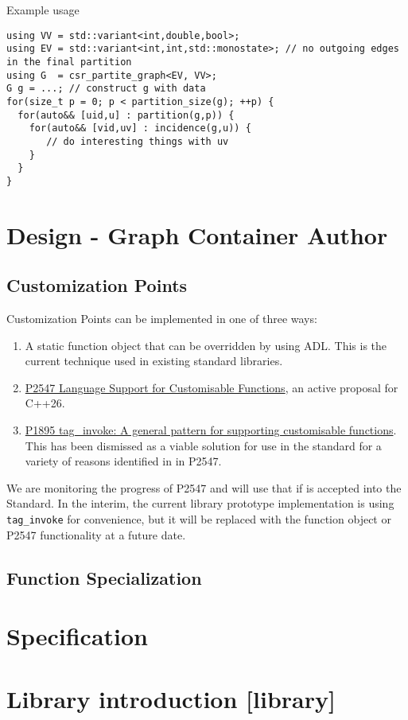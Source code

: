 \documentclass[10pt,onecolumn]{article}
\newcommand{\tcode}[1]{\lstinline[breaklines=true]{#1}}
\begin{document}
Example usage
\begin{lstlisting}
using VV = std::variant<int,double,bool>;
using EV = std::variant<int,int,std::monostate>; // no outgoing edges in the final partition
using G  = csr_partite_graph<EV, VV>;
G g = ...; // construct g with data
for(size_t p = 0; p < partition_size(g); ++p) {
  for(auto&& [uid,u] : partition(g,p)) {
    for(auto&& [vid,uv] : incidence(g,u)) {
       // do interesting things with uv
    }
  }
}
\end{lstlisting}

\section{Design - Graph Container Author}
\subsection{Customization Points}
Customization Points can be implemented in one of three ways:
\begin{enumerate}
\item A static function object that can be overridden by using ADL. This is the current technique used in existing standard libraries.
\item \href{https://wg21.link/P2547}{P2547 Language Support for Customisable Functions}, an active proposal for C++26.
\item \href{https://www.open-std.org/jtc1/sc22/wg21/docs/papers/2019/p1895r0.pdf}{P1895 tag\_invoke: A general pattern for supporting customisable functions}. This has been dismissed as a viable solution for use in the standard for a variety of reasons identified in in P2547.
\end{enumerate}

We are monitoring the progress of P2547 and will use that if is accepted into the Standard. In the interim, the current library prototype implementation is using \tcode{tag_invoke} for convenience, but it will be replaced with the function object or P2547 functionality at a future date.

\subsection{Function Specialization}

\section{Specification}
\section{Library introduction [library]}
\end{document}

